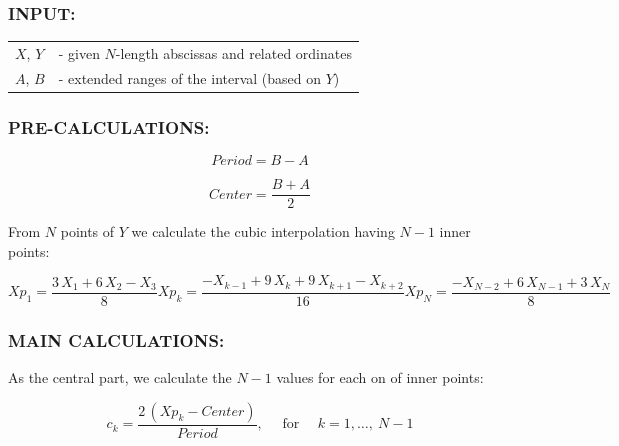 \documentclass[12pt,twoside,a4paper]{article}
\numberwithin{equation}{subsection}
\numberwithin{figure}{subsection}
\begin{document}
\subsubsection*{INPUT:}
 

\begin{tabular}{ l l }

  $X$, $Y$ &- given $N$-length abscissas and related ordinates \\
  $A$, $B$ &- extended ranges of the interval (based on $Y$) \\
  
\end{tabular}


\subsubsection*{PRE-CALCULATIONS:}

\begin{equation} \label{eq:cci_period}
  Period = B - A
\end{equation}

\begin{equation} \label{eq:cci_center}
  Center = \frac{B+A}{2}
\end{equation}

From $N$ points of $Y$ we calculate the cubic interpolation having $N-1$ inner points:

\begin{subequations} \label{eq:cci_cubicinterpolation}
  \begin{equation}   \label{eq:ccicinterp_first}
    Xp_1 = \frac {3 \, X_1 + 6 \, X_2 - X_3}{8}
  \end{equation}
  \begin{equation}   \label{eq:ccicinterp_next}
    Xp_k = \frac { - X_{k - 1} + 9 \, X_k + 9 \, X_{k + 1} - X_{k + 2}}{16}
  \end{equation}
  \begin{equation}   \label{eq:ccicinterp_last}
    Xp_N = \frac { - X_{N - 2} + 6 \, X_{N - 1} + 3 \, X_N}{8}
  \end{equation}
\end{subequations}

\subsubsection*{MAIN CALCULATIONS:}
As the central part, we calculate the $N-1$ values for each on of inner points: 

\begin{equation} \label{eq:cci_newd}
	c_k = \frac{2 \, (Xp_k - Center ) }{Period}, \quad \text{ for } \quad k = 1, \ldots, \ N-1
\end{equation}
\end{document}
